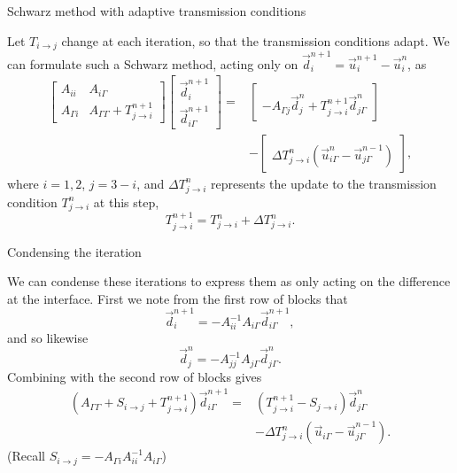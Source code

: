 \documentclass{beamer}
\begin{document}
\begin{frame}{Schwarz method with adaptive transmission conditions}

Let $T_{i \to j}$ change at each iteration, so that the transmission conditions adapt.
We can formulate such a Schwarz method, acting only on $\vec{d}_i^{n+1} = \vec{u}_i^{n+1} - \vec{u}_i^n$, as
\begin{align*}
	\begin{bmatrix} A_{ii} & A_{i \Gamma} \\ A_{\Gamma i} & A_{\Gamma \Gamma} + T_{j \to i}^{n+1} \end{bmatrix}
	\begin{bmatrix} \vec{d}_i^{n+1} \\ \vec{d}_{i \Gamma}^{n+1} \end{bmatrix}
	= & \begin{bmatrix} ~ \\ -A_{\Gamma j} \vec{d}_j^n + T_{j \to i}^{n+1} \vec{d}_{j \Gamma}^n \end{bmatrix} \\
	& - \begin{bmatrix} ~ \\ \Delta T_{j \to i}^n \left ( \vec{u}_{i \Gamma}^n - \vec{u}_{j \Gamma}^{n-1} \right ) \end{bmatrix},
\end{align*}
where $i=1,2$, $j=3-i$, and $\Delta T_{j \to i}^n$ represents the update to the transmission condition $T_{j \to i}^n$ at this step,
\begin{equation*}
	T_{j \to i}^{n+1} = T_{j \to i}^n + \Delta T_{j \to i}^n.
\end{equation*}
\end{frame}

\begin{frame}{Condensing the iteration}

We can condense these iterations to express them as only acting on the difference at the interface.
First we note from the first row of blocks that
\begin{equation*}
	\vec{d}_i^{n+1} = -A_{ii}^{-1} A_{i \Gamma} \vec{d}_{i \Gamma}^{n+1},
\end{equation*}
and so likewise
\begin{equation*}
	\vec{d}_j^{n} = -A_{jj}^{-1} A_{j \Gamma} \vec{d}_{j \Gamma}^{n}.
\end{equation*}
Combining with the second row of blocks gives
\begin{align*}
	\left ( A_{\Gamma \Gamma} + S_{i \to j} + T_{j \to i}^{n+1} \right ) \vec{d}_{i \Gamma}^{n+1} =
	& \left ( T_{j \to i}^{n+1} - S_{j \to i} \right ) \vec{d}_{j \Gamma}^n \\
	& - \Delta T_{j \to i}^n \left ( \vec{u}_{i \Gamma} - \vec{u}_{j \Gamma}^{n-1} \right ).
\end{align*}
(Recall $S_{i \to j} = -A_{\Gamma i} A_{ii}^{-1} A_{i \Gamma}$)
\end{frame}
\end{document}
